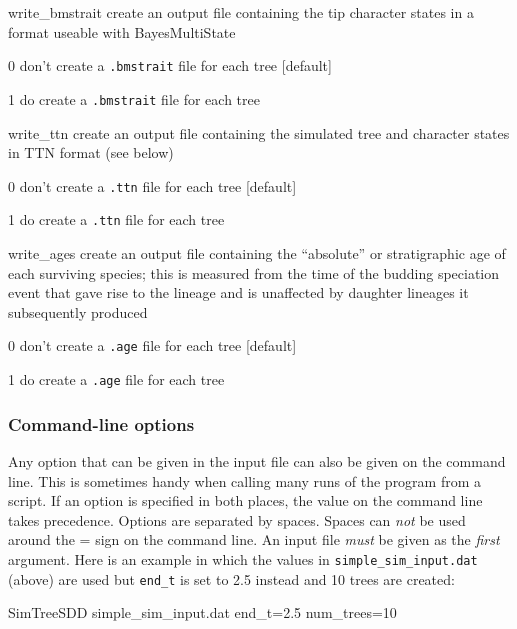 \documentclass[10pt]{article}
\begin{document}
\begin{optdescrip}
	\item[write\_bmstrait] create an output file containing the tip character states in a format useable with BayesMultiState
		\begin{valdescrip}
			\item[0] don't create a \texttt{.bmstrait} file for each tree [default]
			\item[1] do create a \texttt{.bmstrait} file for each tree
		\end{valdescrip}
	\item[write\_ttn] create an output file containing the simulated tree and character states in TTN format (see below)
		\begin{valdescrip}
			\item[0] don't create a \texttt{.ttn} file for each tree [default]
			\item[1] do create a \texttt{.ttn} file for each tree
		\end{valdescrip}
	\item[write\_ages] create an output file containing the ``absolute'' or stratigraphic age of each surviving species; this is measured from the time of the budding speciation event that gave rise to the lineage and is unaffected by daughter lineages it subsequently produced
		\begin{valdescrip}
			\item[0] don't create a \texttt{.age} file for each tree [default]
			\item[1] do create a \texttt{.age} file for each tree
		\end{valdescrip}
\end{optdescrip}


\subsubsection*{Command-line options}

Any option that can be given in the input file can also be given on the command line.  This is sometimes handy when calling many runs of the program from a script.
If an option is specified in both places, the value on the command line takes precedence.  Options are separated by spaces.  Spaces can {\em not} be used around the = sign on the command line.  An input file {\em must} be given as the {\em first} argument.  Here is an example in which the values in \texttt{simple\_sim\_input.dat} (above) are used but \texttt{end\_t} is set to 2.5 instead and 10 trees are created:
\begin{commandis}
	SimTreeSDD simple\_sim\_input.dat end\_t=2.5 num\_trees=10
\end{commandis}
\end{document}
